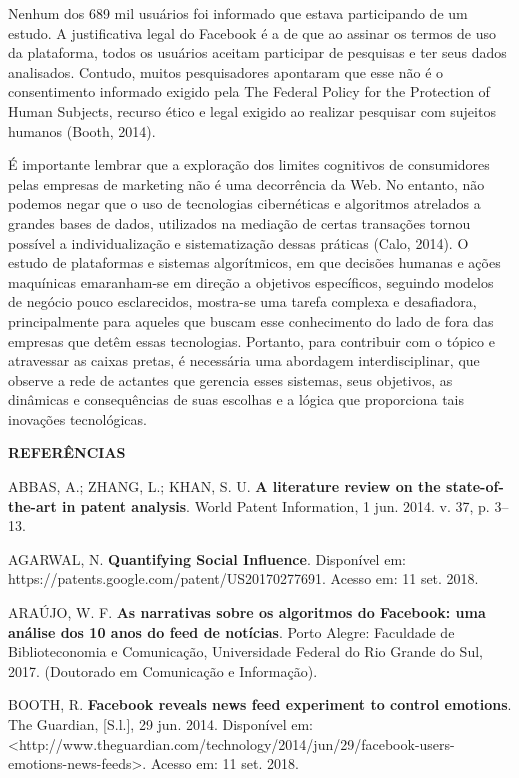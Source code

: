 Nenhum dos 689 mil usuários foi informado que estava participando de um
estudo. A justificativa legal do Facebook é a de que ao assinar os
termos de uso da plataforma, todos os usuários aceitam participar de
pesquisas e ter seus dados analisados. Contudo, muitos pesquisadores
apontaram que esse não é o consentimento informado exigido pela The
Federal Policy for the Protection of Human Subjects, recurso ético e
legal exigido ao realizar pesquisar com sujeitos humanos (Booth, 2014).

É importante lembrar que a exploração dos limites cognitivos de
consumidores pelas empresas de marketing não é uma decorrência da Web.
No entanto, não podemos negar que o uso de tecnologias cibernéticas e
algoritmos atrelados a grandes bases de dados, utilizados na mediação de
certas transações tornou possível a individualização e sistematização
dessas práticas (Calo, 2014). O estudo de plataformas e sistemas
algorítmicos, em que decisões humanas e ações maquínicas emaranham-se em
direção a objetivos específicos, seguindo modelos de negócio pouco
esclarecidos, mostra-se uma tarefa complexa e desafiadora,
principalmente para aqueles que buscam esse conhecimento do lado de fora
das empresas que detêm essas tecnologias. Portanto, para contribuir com
o tópico e atravessar as caixas pretas, é necessária uma abordagem
interdisciplinar, que observe a rede de actantes que gerencia esses
sistemas, seus objetivos, as dinâmicas e consequências de suas escolhas
e a lógica que proporciona tais inovações tecnológicas.

\textbf{REFERÊNCIAS}

\protect\hypertarget{__Fieldmark__1865_1356454502}{}{}A\protect\hypertarget{__Fieldmark__980_193002426}{}{}B\protect\hypertarget{__Fieldmark__1070_1743353457}{}{}BAS,
A.; ZHANG, L.; KHAN, S. U. \textbf{A literature review on the
state-of-the-art in patent analysis}. World Patent Information, 1 jun.
2014. v. 37, p. 3--13.

AGARWAL, N. \textbf{Quantifying Social Influence}. Disponível em:
https://patents.google.com/patent/US20170277691. Acesso em: 11 set.
2018.

ARAÚJO, W. F. \textbf{As narrativas sobre os algoritmos do Facebook: uma
análise dos 10 anos do feed de notícias}. Porto Alegre: Faculdade de
Biblioteconomia e Comunicação, Universidade Federal do Rio Grande do
Sul, 2017. (Doutorado em Comunicação e Informação).

BOOTH, R. \textbf{Facebook reveals news feed experiment to control
emotions}. The Guardian, {[}S.l.{]}, 29 jun. 2014. Disponível em:
\textless{}http://www.theguardian.com/technology/2014/jun/29/facebook-users-emotions-news-feeds\textgreater{}.
Acesso em: 11 set. 2018.

